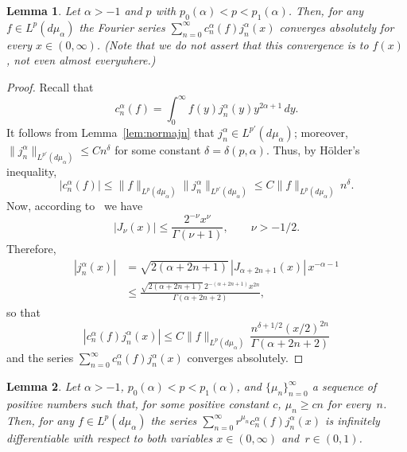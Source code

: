 \documentclass[11pt,a4paper]{amsart}
\newcommand{\mua}{d\mu_\alpha}
\newcommand{\jna}{j_n^{\alpha}}
\newcommand{\cna}{c_n^{\alpha}}
\newcommand{\lpnorm}[3]{\|{#1}\|_{L^{#2}({#3})}} %
\theoremstyle{plain}
\newtheorem{lem}{Lemma}
\theoremstyle{remark}
\begin{document}
\begin{lem}
\label{lem:convae}
Let $\alpha > -1$ and $p$ with $p_0(\alpha)<p< p_1(\alpha)$.
Then, for any $f \in L^p(\mua)$ the Fourier series $\sum_{n=0}^\infty \cna(f)\jna(x)$ converges absolutely for every $x \in (0,\infty)$. (Note that we do not assert that this convergence is to $f(x)$, not even almost everywhere.)
\end{lem}

\begin{proof}
Recall that
\begin{equation}
\label{eq:fourier}
  \cna(f) = \int_0^\infty f(y) \jna(y) y^{2\alpha+1} \, dy.
\end{equation}
It follows from Lemma~\ref{lem:normajn} that
$\jna \in L^{p'}(\mua)$; moreover,
$\lpnorm{\jna}{p'}{\mua} \le C n^\delta$
for some constant $\delta = \delta(p,\alpha)$. Thus,
by H\"older's inequality,
\begin{equation*}
   |\cna(f)|
   \le \lpnorm{f}p{\mua}
       \lpnorm{\jna}{p'}{\mua}
   \le C \lpnorm{f}p{\mua}\,n^\delta.
\end{equation*}
Now, according to~\cite[Ch.~III, 3.31 (1), p.~49]{Wat} we have
\begin{equation*}
   |J_\nu(x)| \leq \frac{2^{-\nu} x^\nu}{\Gamma(\nu+1)},
   \qquad \nu > -1/2.
\end{equation*}
Therefore,
\begin{align*}
   |\jna(x)|
   &= \sqrt{2(\alpha+2n+1)}\,|J_{\alpha+2n+1}(x)|
   \,x^{-\alpha-1} \\
   &\leq \frac{\sqrt{2(\alpha+2n+1)}\,2^{-(\alpha+2n+1)} x^{2n}}
             {\Gamma(\alpha+2n+2)},
\end{align*}
so that
\begin{equation}
\label{eq:summand}
   |\cna(f) \jna(x)| \leq C \lpnorm{f}p{\mua}
   \,\frac{n^{\delta+1/2} (x/2)^{2n}}{\Gamma(\alpha+2n+2)}
\end{equation}
and the series $\sum_{n=0}^\infty \cna(f) \jna(x)$ converges absolutely.
\end{proof}

\begin{lem}
\label{lem:deriv}
Let $\alpha > -1$, $p_0(\alpha)<p< p_1(\alpha)$,
and $\{\mu_n\}_{n=0}^\infty$ a sequence of positive numbers such that, for some positive constant $c$, $\mu_n \ge cn$ for every~$n$. Then, for any $f \in L^p(\mua)$ the series $\sum_{n=0}^\infty r^{\mu_n} \cna(f)\jna(x)$ is infinitely differentiable with respect to both variables $x \in (0,\infty)$ and~$r \in (0,1)$.
\end{lem}
\end{document}
